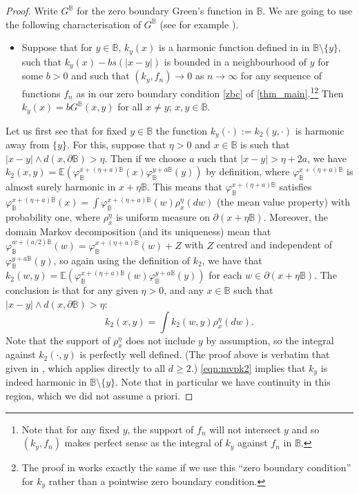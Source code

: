 \documentclass[10pt]{amsart}
\theoremstyle{definition}
\newcommand{\B}{\mathbb{B}}\let\D\B\let\Ub\B
\begin{document}
\begin{proof}
Write $G^\B$ for the zero boundary Green's function in $\B$.
We are going to use the following characterisation of $G^\B$ (see for example \cite[Lem.\,3.7]{WPgff}).
\begin{itemize}
\item[$(\star)$] Suppose that for $y\in \B$, $k_y(x)$ is a harmonic function defined in in $\B\setminus \{y\}$, such that $k_y(x)-bs(|x-y|)$ is bounded in a neighbourhood of $y$ for some $b > 0$ and such that $(k_y,f_n)\to 0$ as $n\to \infty$ for any sequence of functions $f_n$ as in our zero boundary condition \eqref{zbc} of \cref{thm_main}.\footnote{Note that for any fixed $y$, the support of $f_n$ will not intersect $y$ and so $(k_y,f_n)$ makes perfect sense as the integral of $k_y$ against $f_n$ in $\B$.}\footnote{The proof in \cite{WPgff} works exactly the same if we use this ``zero boundary condition'' for $k_y$ rather than a pointwise zero boundary condition.} Then $k_y(x)=bG^\B(x,y)$ for all $x\ne y$; $x,y\in \B$.
\end{itemize}

Let us first see that for fixed $y\in \B$ the function $k_y(\cdot):=k_2(y,\cdot)$ is harmonic away from $\{y\}$. For this, suppose that $\eta>0$ and $x\in \B$ is such that $|x-y|\wedge d(x,\partial \B)>\eta$. Then if we choose $a$ such that $|x-y|>\eta+2a$, we have $k_2(x,y)=\mathbb{E}(\varphi_{\B}^{x+(\eta+a)\B}(x)\varphi_{\B}^{y+a\B}(y))$ by definition, where $\varphi_{\B}^{x+(\eta+a)\B}$ is almost surely harmonic in $x+\eta\B$. This means that $\varphi_{\B}^{x+(\eta+a)\B}$ satisfies $\varphi_{\B}^{x+(\eta+a)\B}(x)=\int \varphi_{\B}^{x+(\eta+a)\B}(w) \rho_x^\eta(dw) $ (the mean value property) with probability one, where $\rho_{x}^\eta$ is uniform measure on $\partial(x+\eta\B)$. Moreover, the domain Markov decomposition (and its uniqueness) mean that $\varphi_{\B}^{w+(a/2)\B}(w)=\varphi_{\B}^{x+(\eta+a)\B}(w)+Z$ with $Z$ centred and independent of $\varphi_{\B}^{y+a\B}(y)$, so again using the definition of $k_2$, we have that $k_2(w,y)=\mathbb{E}(\varphi_{\B}^{x+(\eta+a)\B}(w)\varphi_{\B}^{y+a\B}(y))$ for each $w\in \partial(x+\eta\B)$. The conclusion is that for any given $\eta>0$, and any $x\in \B$ such that $|x-y|\wedge d(x,\partial \B)>\eta$:
\begin{equation} \label{eqn:mvpk2} k_2(x,y)=\int k_2(w,y) \rho_{x}^\eta(dw).\end{equation}
Note that the support of $\rho_x^\eta$ does not include $y$ by assumption, so the integral against $k_2(\cdot, y)$ is perfectly well defined. (The proof above is verbatim that given in \cite[Lem.\,2.9]{BPR18}, which applies directly to all $d\ge 2$.) \eqref{eqn:mvpk2} implies that $k_y$ is indeed harmonic in $\B\setminus \{y\}$. Note that in particular we have continuity in this region, which we did not assume a priori.


\end{proof}
\end{document}

